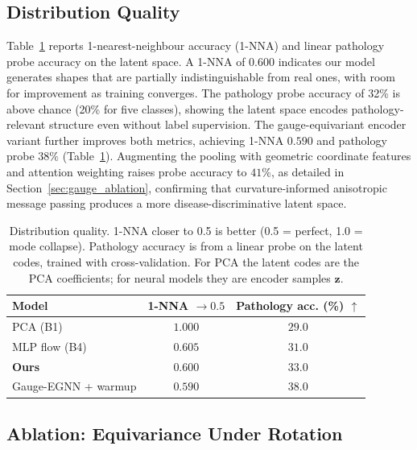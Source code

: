 \documentclass{article}
\begin{document}
\subsection{Distribution Quality}

Table~\ref{tab:generation} reports 1-nearest-neighbour accuracy (1-NNA) and
linear pathology probe accuracy on the latent space.
A 1-NNA of 0.600 indicates our model generates shapes that are partially
indistinguishable from real ones, with room for improvement as training
converges.
The pathology probe accuracy of 32\% is above chance (20\% for five classes),
showing the latent space encodes pathology-relevant structure even without
label supervision.
The gauge-equivariant encoder variant further improves both metrics,
achieving 1-NNA $0.590$ and pathology probe $38\%$ (Table~\ref{tab:generation}).
Augmenting the pooling with geometric coordinate features and attention
weighting raises probe accuracy to $41\%$, as detailed in
Section~\ref{sec:gauge_ablation}, confirming that curvature-informed
anisotropic message passing produces a more disease-discriminative
latent space.

\begin{table}[h]
\centering
\caption{Distribution quality. 1-NNA closer to 0.5 is better (0.5 = perfect,
         1.0 = mode collapse). Pathology accuracy is from a linear probe on
         the latent codes, trained with cross-validation. For PCA the latent
         codes are the PCA coefficients; for neural models they are encoder
         samples $\mathbf{z}$.}
\label{tab:generation}
\begin{tabular}{lcc}
\toprule
Model & 1-NNA $\rightarrow 0.5$ & Pathology acc. (\%) $\uparrow$ \\
\midrule
PCA (B1)               & $1.000$            & $29.0$             \\
MLP flow (B4)          & $0.605$            & $31.0$             \\
\textbf{Ours}          & $0.600$            & $33.0$             \\
Gauge-EGNN + warmup    & $\mathbf{0.590}$   & $\mathbf{38.0}$    \\
\bottomrule
\end{tabular}
\end{table}

\subsection{Ablation: Equivariance Under Rotation}
\end{document}
